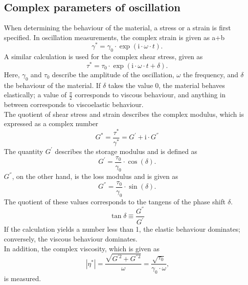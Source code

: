 \documentclass[10pt,a4paper,ngerman]{scrartcl}
\begin{document}
	\subsection{Complex parameters of oscillation}
		When determining the behaviour of the material, a stress or a strain is first specified. In oscillation measurements, the complex strain is given as a+b
		\begin{equation}
			\gamma^* = \gamma_0 \cdot \exp(\text{i} \cdot \omega \cdot t) \text{.}
		\end{equation}
		A similar calculation is used for the complex shear stress, given as 
		\begin{equation}
			\tau^* = \tau_0 \cdot \exp(\text{i} \cdot \omega \cdot t + \delta) \text{.}
		\end{equation}
		Here, $\gamma_0$ and $\tau_0$ describe the amplitude of the oscillation, $\omega$ the frequency, and $\delta$ the behaviour of the material. If $\delta$ takes the 
		value 0, the material behaves elastically; a value of $\frac{\pi}{2}$ corresponds to viscous behaviour, and anything in between corresponds to viscoelastic 
		behaviour.\\
		The quotient of shear stress and strain describes the complex modulus, which is expressed as a complex number
		\begin{equation}
			G^* = \frac{\tau^*}{\gamma^*} = G^{'} + \text{i} \cdot G^{''}
		\end{equation}
		The quantity $G^{'}$ describes the storage modulus and is defined as
		\begin{equation}
			G^{'} = \frac{\tau_0}{\gamma_0} \cdot \cos(\delta) \text{.}
		\end{equation}
		$G^{''}$, on the other hand, is the loss modulus and is given as 
		\begin{equation}
			G^{''} = \frac{\tau_0}{\gamma_0} \cdot \sin(\delta) \text{.}
		\end{equation}
		The quotient of these values corresponds to the tangens of the phase shift $\delta$.
		\begin{equation}
			\tan \delta \equiv \frac{G^{''}}{G^{'}}
		\end{equation}
		If the calculation yields a number less than 1, the elastic behaviour dominates; conversely, the viscous behaviour dominates.\\
		In addition, the complex viscosity, which is given as
		\begin{equation}
			|\eta^*| = \frac{\sqrt{G^{'2} + G^{''2}}}{\omega} = \frac{\sqrt{\tau_0}}{\gamma_0 \cdot \omega} \text{,}
		\end{equation}
		is measured. \cite{polyskript}
\end{document}
